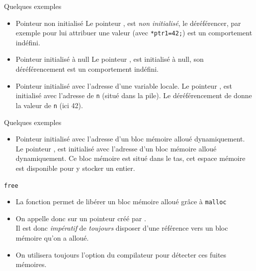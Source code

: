 \documentclass[10pt]{beamer}
\begin{document}
\begin{frame}[fragile]{\Ctitle}{\stitle}
	\begin{exampleblock}{Quelques exemples}
		\begin{itemize}
		\item<1-> Pointeur non initialisé
		Le pointeur , est \textit{non initialisé}, le déréférencer, par exemple pour lui attribuer une valeur (avec \texttt{*ptr1=42;}) est un comportement indéfini.
		\item<2-> Pointeur initialisé à {\sc null}
		Le pointeur , est initialisé à {\sc null}, son déréférencement est un comportement indéfini. 
		\item<3-> Pointeur initialisé avec l'adresse d'une variable locale.
		Le pointeur , est initialisé avec l'adresse de {\tt n} (situé dans la pile). Le déréférencement de  donne la valeur de {\tt n} (ici 42).
		\end{itemize}
	\end{exampleblock}
\end{frame}

\begin{frame}[fragile]{\Ctitle}{\stitle}
	\begin{exampleblock}{Quelques exemples}
		\begin{itemize}
			\item<1-> Pointeur initialisé avec l'adresse d'un bloc mémoire alloué dynamiquement.
			Le pointeur , est initialisé avec l'adresse d'un bloc mémoire alloué dynamiquement. Ce bloc mémoire est situé dans le \textcolor{BrickRed}{tas}, cet espace mémoire est disponible pour y stocker un entier.
		\end{itemize}
	\end{exampleblock}
\end{frame}

\begin{frame}[fragile]{\Ctitle}{\stitle}
	\begin{alertblock}{{\tt free}}
		\begin{itemize}
			\item<1-> La fonction  permet de libérer un bloc mémoire alloué grâce à {\tt malloc}
			\item<2-> On appelle donc  sur un pointeur  créé par . \\
			\textcolor{BrickRed}{\small \danger \;}{Il est donc \textit{impératif} de \textit{toujours} disposer d'une référence vers un bloc mémoire qu'on a alloué.}
			\item<4-> On utilisera toujours l'option  du compilateur pour détecter ces fuites mémoires.
		\end{itemize}
	\end{alertblock}
\end{frame}
\end{document}
